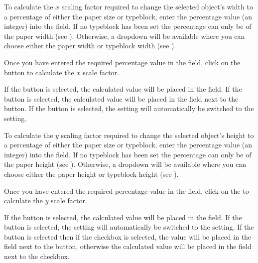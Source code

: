To calculate the $x$ scaling factor required to change the selected
object's width to a percentage of either the paper size or
\gls{typeblock}, enter the percentage value (an integer) into the
 field. If no \gls{typeblock} has been set
the percentage can only be of the paper width (see
). 
Otherwise, a \gls{dropdown} will be
available where you can choose either the paper width or
\gls{typeblock} width (see ).

Once you have entered the required percentage value in the
 field, click on the  button
to calculate the $x$ scale factor.

If the  button is selected, the calculated value
will be placed in the  field. If the
 button is selected, the calculated value will be
placed in the field next to the  button.
If the  button is selected, the setting will
automatically be switched to the  setting.

To calculate the $y$ scaling factor required to change the selected
object's height to a percentage of either the paper size or
\gls{typeblock}, enter the percentage value (an integer) into the
 field. If no \gls{typeblock} has been set the
percentage can only be of the paper height (see
).
Otherwise, a \gls{dropdown} will be available where you can choose
either the paper height or \gls{typeblock} height (see
).

Once you have entered the required percentage value in the
 field, click on the 
to calculate the $y$ scale factor.

If the  button is selected, the calculated value
will be placed in the  field.
If the  button is selected, the setting will
automatically be switched to the  setting.
If the  button is selected then
if the  checkbox is selected, the value will be placed in the
field next to the  button, otherwise the calculated value will be
placed in the  field next to the  checkbox.




